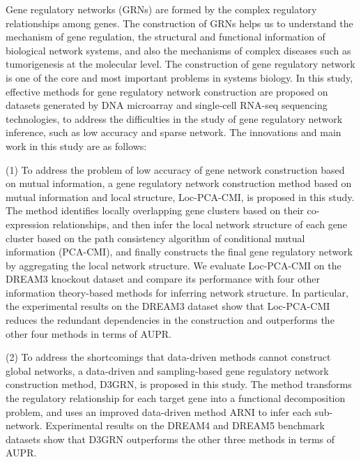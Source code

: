 \begin{abstracten}\setlength{\baselineskip}{20pt}


Gene regulatory networks (GRNs) are formed by the complex regulatory relationships among genes. 
The construction of GRNs helps us to understand the mechanism of gene regulation, the structural and functional information of biological network systems, and also the mechanisms of complex diseases such as tumorigenesis at the molecular level.
The construction of gene regulatory network is one of the core and most important problems in systems biology.
In this study, effective methods for gene regulatory network construction are proposed on datasets generated by  DNA microarray and single-cell  RNA-seq  sequencing technologies, 
to address  the difficulties in the study of gene regulatory network inference, such as low accuracy and sparse network.
The innovations and main work in this study are as follows:

(1) To address the problem of low accuracy of gene network construction based on mutual information, 
a gene regulatory network construction method based on mutual information and local structure, Loc-PCA-CMI, is proposed in this study. 
The method identifies locally overlapping gene clusters based on their co-expression relationships, and then infer the local network structure of each gene cluster based on the path consistency algorithm of conditional mutual information (PCA-CMI), 
and finally constructs the final gene regulatory network by aggregating the local network structure.
We evaluate Loc-PCA-CMI on the DREAM3 knockout dataset and compare its performance with four other information theory-based methods for inferring network structure.
In particular, the experimental results on the DREAM3 dataset show that Loc-PCA-CMI  reduces the redundant dependencies 
in the construction  and outperforms the other four  methods in terms of AUPR.

(2) To address the shortcomings that data-driven methods cannot construct global networks, 
a data-driven and sampling-based gene regulatory network construction method, D3GRN, 
is proposed in this study. 
The method transforms the regulatory relationship for each target gene into a functional decomposition problem, 
and uses an improved data-driven method ARNI to infer each sub-network.
Experimental results on the DREAM4 and DREAM5 benchmark datasets show that D3GRN outperforms the other three methods in terms of AUPR.


\end{abstracten}
